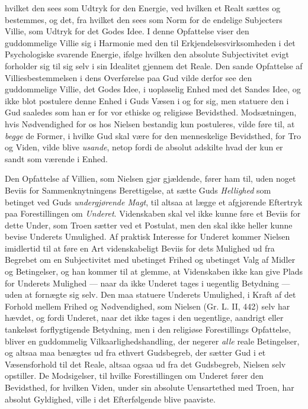 \documentclass[12pt,a4paper]{book}
\newcommand{\opage}[1]{\marginnote{\footnotesize\textit{[#1]}}}
\begin{document}
hvilket den sees som Udtryk for den Energie, ved hvilken et Realt sættes og bestemmes, og
det, fra hvilket den sees som Norm for de endelige Subjecters Villie, som Udtryk for det
Godes Idee. I denne Opfattelse viser den guddommelige Villie sig i Harmonie med den til
Erkjendelsesvirksomheden i det Psychologiske svarende Energie, ifølge hvilken den absolute
Subjectivitet evigt forholder sig til sig selv i sin Idealitet gjennem det Reale. Den sande
Opfattelse af Villiesbestemmelsen i dens Overførelse paa Gud vilde derfor see den
guddommelige Villie, det Godes Idee, i uopløselig Enhed med det Sandes Idee, og ikke blot
postulere denne Enhed i Guds Væsen i og for sig, men statuere den i Gud saaledes som han er
for vor ethiske og religiøse Bevidsthed. Modsætningen, hvis Nødvendighed for os hos Nielsen
bestandig kun postuleres, vilde føre til, at \emph{begge} de Former, i hvilke Gud skal være
for den menneskelige Bevidsthed, for Tro og Viden, vilde blive \emph{usande}, netop fordi de
absolut adskilte hvad der kun er sandt som værende i Enhed.

\opage{167}Den Opfattelse af Villien, som Nielsen gjør gjældende, fører ham til, uden noget Beviis for
Sammenknytningens Berettigelse, at sætte Guds \emph{Hellighed} som betinget ved Guds \emph{undergjørende Magt}, til altsaa at lægge et afgjørende Eftertryk paa Forestillingen om \emph{Underet}. Videnskaben skal vel ikke kunne føre et Beviis for dette Under, som Troen sætter
ved et Postulat, men den skal ikke heller kunne bevise Underets Umulighed. Af praktisk
Interesse for Underet kommer Nielsen imidlertid til at føre en Art videnskabeligt Beviis for
dets Mulighed ud fra Begrebet om en Subjectivitet med ubetinget Frihed og ubetinget Valg af
Midler og Betingelser, og han kommer til at glemme, at Videnskaben ikke kan give Plads for
Underets Mulighed --- naar da ikke Underet tages i uegentlig Betydning --- uden at fornægte
sig selv. Den maa statuere Underets Umulighed, i Kraft af det Forhold mellem Frihed og
Nødvendighed, som Nielsen (Gr. L. II, 442) selv har hævdet, og fordi Underet, naar det ikke
tages i den uegentlige, aandrigt eller tankeløst forflygtigende Betydning, men i den
religiøse Forestillings Opfattelse, bliver en guddommelig Vilkaarlighedshandling, der
negerer \emph{alle} reale Betingelser, og altsaa maa benægtes ud fra ethvert Gudsbegreb, der sætter
Gud i et Væsensforhold til det Reale, altsaa ogsaa ud fra det Gudsbegreb, Nielsen selv
opstiller. De Modsigelser, til hvilke Forestillingen om Underet fører den Bevidsthed, for
hvilken Viden, under sin absolute Uensartethed med Troen, har absolut Gyldighed, ville i det
Efterfølgende blive paaviste.
\end{document}
